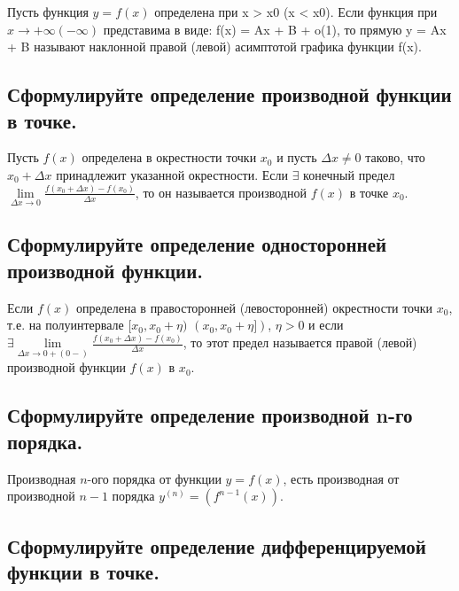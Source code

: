 Пусть функция $y = f(x)$ определена при x > x0 (x < x0). Если функция при $x \rightarrow +\infty (-\infty)$ представима в виде: f(x) = Ax + B + o(1), то прямую y = Ax + B называют наклонной правой (левой) асимптотой графика функции f(x).



\subsection{Сформулируйте определение производной функции в точке.}

Пусть $f(x)$ определена в окрестности точки $x_0$ и пусть $\Delta x \ne 0$ таково, что $x_0+\Delta x$ принадлежит указанной окрестности. Если $\exists$ конечный предел $\lim\limits_{\Delta x \to 0}\frac{f(x_0+\Delta x) - f(x_0)}{\Delta x}$, то он называется производной $f(x)$ в точке $x_0$.


\subsection{Сформулируйте определение односторонней производной функции.}

Если $f(x)$ определена в правосторонней (левосторонней) окрестности точки $x_0$, т.е. на полуинтервале $[x_0,x_0+\eta)$ $(x_0,x_0+\eta])$, $\eta > 0$ и если $\exists \lim\limits_{\Delta x \to 0+(0-)}\frac{f(x_0+\Delta x) - f(x_0)}{\Delta x}$, то этот предел называется правой (левой) производной функции $f(x)$ в $x_0$.



\subsection{Сформулируйте определение производной n-го порядка.}

Производная $n$-ого порядка от функции $y = f(x)$, есть производная от производной $n-1$ порядка $y^{(n)} = (f^{n-1}(x))$.



\subsection{Сформулируйте определение дифференцируемой функции в точке.}

